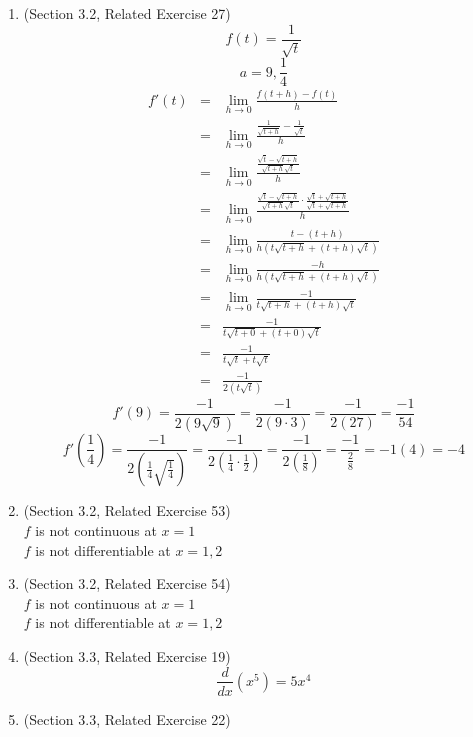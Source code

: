 \documentclass{article}
\begin{document}
\begin{enumerate}
    \item (Section 3.2, Related Exercise 27)
        $$f(t) = \frac{1}{\sqrt{t}}$$
        $$a = 9, \frac{1}{4}$$
        \begin{eqnarray}
            f'(t) &=& \lim_{h \to 0}{\frac{f(t + h) - f(t)}{h}} \\
                  &=& \lim_{h \to 0}{\frac{\frac{1}{\sqrt{t + h}} - \frac{1}{\sqrt{t}}}{h}} \\
                  &=& \lim_{h \to 0}{\frac{\frac{\sqrt{t} - \sqrt{t + h}}{\sqrt{t + h}\sqrt{t}}}{h}} \\
                  &=& \lim_{h \to 0}{\frac{\frac{\sqrt{t} - \sqrt{t + h}}{\sqrt{t + h}\sqrt{t}} \cdot \frac{\sqrt{t} + \sqrt{t + h}}{\sqrt{t} + \sqrt{t + h}}}{h}} \\
                  &=& \lim_{h \to 0}{\frac{t - (t + h)}{h(t\sqrt{t + h} + (t + h)\sqrt{t})}} \\
                  &=& \lim_{h \to 0}{\frac{- h}{h(t\sqrt{t + h} + (t + h)\sqrt{t})}} \\
                  &=& \lim_{h \to 0}{\frac{- 1}{t\sqrt{t + h} + (t + h)\sqrt{t}}} \\
                  &=& \frac{- 1}{t\sqrt{t + 0} + (t + 0)\sqrt{t}} \\
                  &=& \frac{- 1}{t\sqrt{t} + t\sqrt{t}} \\
                  &=& \frac{- 1}{2(t\sqrt{t})}
        \end{eqnarray}
        $$f'(9) = \frac{-1}{2 \left (9\sqrt{9} \right )} = \frac{-1}{2 \left (9 \cdot 3 \right )} = \frac{-1}{2\left(27\right)} = \frac{-1}{54}$$
        $$f'\left(\frac{1}{4}\right) = \frac{-1}{2\left(\frac{1}{4}\sqrt{\frac{1}{4}}\right)} = \frac{-1}{2\left(\frac{1}{4} \cdot \frac{1}{2}\right)} = \frac{-1}{2\left(\frac{1}{8}\right)} = \frac{-1}{\frac{2}{8}} = -1\left(4\right) = -4$$
    \item (Section 3.2, Related Exercise 53)
    \\ $f$ is not continuous at $x = 1$
    \\ $f$ is not differentiable at $x = 1, 2$
    \item (Section 3.2, Related Exercise 54)
    \\ $f$ is not continuous at $x = 1$
    \\ $f$ is not differentiable at $x = 1, 2$
    \item (Section 3.3, Related Exercise 19)
        $$\frac{d}{dx}\left(x^5\right) = 5x^4$$
    \item (Section 3.3, Related Exercise 22)

\end{enumerate}
\end{document}
